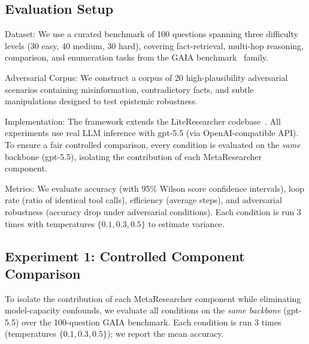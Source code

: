 \documentclass[notspecified,article,accept,pdftex,moreauthors]{Definitions/mdpi}
\renewcommand{\textbf}[1]{#1}
\begin{document}
\subsection{Evaluation Setup}
\textbf{Dataset:} We use a curated benchmark of 100 questions spanning three difficulty levels (30 easy, 40 medium, 30 hard), covering fact-retrieval, multi-hop reasoning, comparison, and enumeration tasks from the GAIA benchmark~\cite{b2} family.

\textbf{Adversarial Corpus:} We construct a corpus of 20 high-plausibility adversarial scenarios containing misinformation, contradictory facts, and subtle manipulations designed to test epistemic robustness.

\textbf{Implementation:} The framework extends the LiteResearcher codebase~\cite{b1}. All experiments use real LLM inference with gpt-5.5 (via OpenAI-compatible API). To ensure a fair controlled comparison, every condition is evaluated on the \textit{same} backbone (gpt-5.5), isolating the contribution of each MetaResearcher component.

\textbf{Metrics:} We evaluate accuracy (with 95\% Wilson score confidence intervals), loop rate (ratio of identical tool calls), efficiency (average steps), and adversarial robustness (accuracy drop under adversarial conditions). Each condition is run 3 times with temperatures $\{0.1, 0.3, 0.5\}$ to estimate variance.

\subsection{Experiment 1: Controlled Component Comparison}
\label{sec:e1}
To isolate the contribution of each MetaResearcher component while eliminating model-capacity confounds, we evaluate all conditions on the \textit{same backbone} (gpt-5.5) over the 100-question GAIA benchmark. Each condition is run 3 times (temperatures $\{0.1, 0.3, 0.5\}$); we report the mean accuracy.
\end{document}
